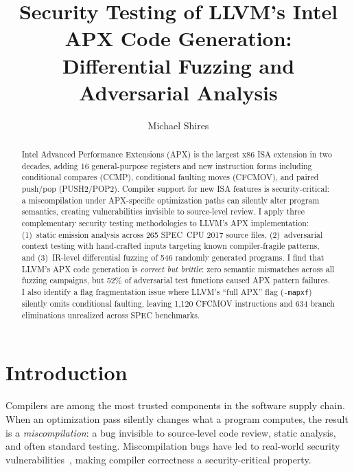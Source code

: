 \documentclass[acmsmall,nonacm]{acmart}
\begin{document}
\title{Security Testing of LLVM's Intel APX Code Generation:\\Differential Fuzzing and Adversarial Analysis}

\author{Michael Shires}

\begin{abstract}
Intel Advanced Performance Extensions (APX) is the largest x86 ISA
extension in two decades, adding 16 general-purpose registers and new
instruction forms including conditional compares (CCMP), conditional
faulting moves (CFCMOV), and paired push/pop (PUSH2/POP2). Compiler
support for new ISA features is security-critical: a miscompilation
under APX-specific optimization paths can silently alter program
semantics, creating vulnerabilities invisible to source-level review.
I apply three complementary security testing methodologies to LLVM's
APX implementation: (1)~static emission analysis across 265 SPEC~CPU
2017 source files, (2)~adversarial context testing with hand-crafted
inputs targeting known compiler-fragile patterns, and (3)~IR-level
differential fuzzing of 546 randomly generated programs. I find that
LLVM's APX code generation is \emph{correct but brittle}: zero
semantic mismatches across all fuzzing campaigns, but 52\% of
adversarial test functions caused APX pattern failures. I also
identify a flag fragmentation issue where LLVM's ``full APX'' flag
(\texttt{-mapxf}) silently omits conditional faulting, leaving 1,120
CFCMOV instructions and 634 branch eliminations unrealized across
SPEC benchmarks.
\end{abstract}

\maketitle

\section{Introduction}

Compilers are among the most trusted components in the software supply
chain. When an optimization pass silently changes what a program
computes, the result is a \emph{miscompilation}: a bug invisible to
source-level code review, static analysis, and often standard testing.
Miscompilation bugs have led to real-world security
vulnerabilities~\cite{yang2011csmith, wang2013towards}, making
compiler correctness a security-critical property.
\end{document}
